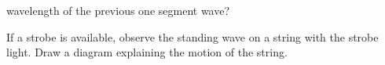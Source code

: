 
wavelength of the previous one segment wave?




If a strobe is available, observe the standing wave on a string with the 
strobe light. Draw a diagram explaining the motion of the string.




